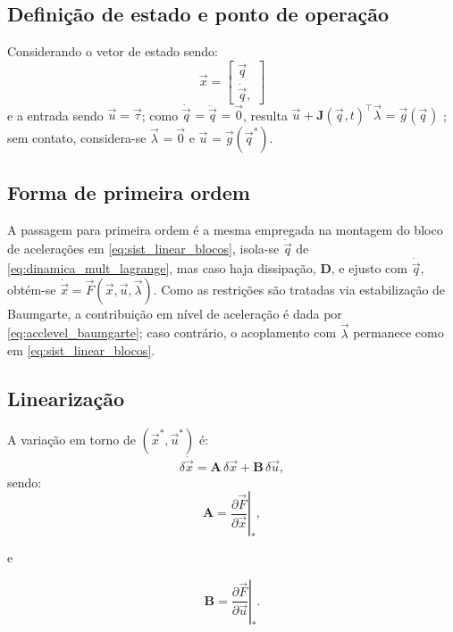 \subsection{Definição de estado e ponto de operação}
Considerando o vetor de estado sendo:
\begin{equation}
\vec x=
\begin{bmatrix}
\vec q\\
\dot{\vec q},
\end{bmatrix}
\end{equation}
e a entrada sendo $\vec u=\vec\tau$;
como $\dot{\vec q}^{}=\ddot{\vec q}^{}=\vec 0$, resulta 
$\vec u^{}+\mathbf J(\vec q^{},t)^{\top}\vec\lambda^{}=\vec g(\vec q^{})$
;
sem contato, considera-se $\vec\lambda^{}=\vec 0$ e $\vec u^{}=\vec g(\vec q^{*})$.

\subsection{Forma de primeira ordem}
A passagem para primeira ordem é a mesma empregada na montagem do bloco de acelerações em
\eqref{eq:sist_linear_blocos},
isola-se $\ddot{\vec q}$ de
\eqref{eq:dinamica_mult_lagrange}, mas
caso haja dissipação, $\mathbf D$,
e ejusto com $\dot{\vec q}$,
obtém-se $\dot{\vec x}=\vec F(\vec x,\vec u,\vec\lambda)$.
Como as restrições são tratadas via estabilização de Baumgarte, a contribuição em nível de aceleração é dada por \eqref{eq:acclevel_baumgarte};
caso contrário, o acoplamento com $\vec\lambda$ permanece como em \eqref{eq:sist_linear_blocos}.

\subsection{Linearização}
A variação em torno de $(\vec x^{*},\vec u^{*})$ é:
\begin{equation}
\delta\dot{\vec x}
=
\mathbf A\,\delta\vec x+\mathbf B\,\delta\vec u,
\label{eq:ss_linear_cont1}
\end{equation}
sendo:
\begin{equation}
\mathbf A=\left.\frac{\partial \vec F}{\partial \vec x}\right|_{*},
\label{eq:ss_linear_cont2}
\end{equation}

e

\begin{equation}
\mathbf B=\left.\frac{\partial \vec F}{\partial \vec u}\right|_{*}.
\label{eq:ss_linear_cont}
\end{equation}


